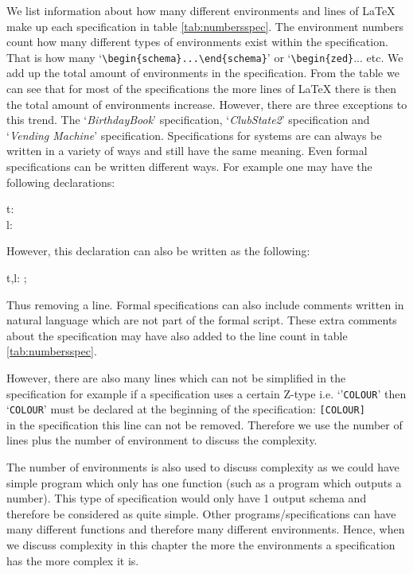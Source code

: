 We list information about how many different environments and lines of \LaTeX{}
make up each specification in table \ref{tab:numbersspec}. The environment
numbers count how many different types of environments exist within the
specification. That is how many `\verb|\begin{schema}...\end{schema}|' or
`\verb|\begin{zed}|... etc. We add up the total amount of environments in the
specification. From the table we can see that for most of the specifications the
more lines of \LaTeX{} there is then the total amount of environments increase.
However, there are three exceptions to this trend. The `\emph{BirthdayBook}'
specification, `\emph{ClubState2}' specification and `\emph{Vending Machine}'
specification. Specifications for systems are can always be written in a variety
of ways and still have the same meaning. Even formal specifications can be
written different ways. For example one may have the following declarations:

\begin{zed}
t:\nat \\
l: \nat 
\end{zed}

However, this declaration can also be written as the following:
\begin{zed}
t,l: ;\nat
\end{zed}

Thus removing a line. Formal specifications can also include comments written in
natural language which are not part of the formal script. These extra comments
about the specification may have also added to the line count in table
\ref{tab:numbersspec}.

However, there are also many lines which can not be simplified in the specification
for example if a specification uses a certain Z-type i.e. `'\texttt{COLOUR}' then
`\texttt{COLOUR}' must be declared at the beginning of the specification:
\verb|[COLOUR]|\\
in the specification this line can not be removed. Therefore
we use the number of lines plus the number of environment to discuss the complexity.

The number of environments is also used to discuss complexity as we could have simple
program which only has one function (such as a program which outputs a number). This 
type of specification would only have 1 output schema and therefore be considered as 
quite simple. Other programs/specifications can have many different functions and 
therefore many different environments. Hence, when we discuss complexity in this chapter
the more the environments a specification has the more complex it is.

